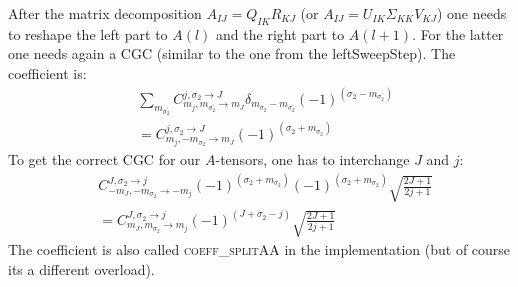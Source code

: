\documentclass[a4paper,10pt,parskip=full]{scrartcl}
\begin{document}
After the matrix decomposition $A_{IJ}=Q_{IK}R_{KJ}$ (or
$A_{IJ}=U_{IK}\Sigma_{KK}V_{KJ}$) one needs to reshape the left part
to $A(l)$ and the right part to $A(l+1)$. For the latter one needs
again a CGC (similar to the one from the leftSweepStep). The
coefficient is:
\begin{equation}
  \begin{split}
    &\sum_{m_{\sigma_2^\prime}}C^{j,\sigma_2\rightarrow
      J}_{m_j,m_{\sigma_2^\prime}\rightarrow
      m_{J}}\delta_{m_{\sigma_2}-m_{\sigma_2^\prime}}(-1)^{(\sigma_2-m_{\sigma_2^\prime})}\\
    &=C^{j,\sigma_2\rightarrow
      J}_{m_j,-m_{\sigma_2}\rightarrow
      m_{J}}(-1)^{(\sigma_2+m_{\sigma_2})}
  \end{split}
\end{equation}
To get the correct CGC for our $A$-tensors, one has to interchange $J$
and $j$:
\begin{equation}
  \begin{split}
    &C^{J,\sigma_2\rightarrow
      j}_{-m_J,-m_{\sigma_2}\rightarrow
      -m_{j}}(-1)^{(\sigma_2+m_{\sigma_2})}(-1)^{(\sigma_2+m_{\sigma_2})}\sqrt{\frac{2J+1}{2j+1}}\\
    &=C^{J,\sigma_2\rightarrow
      j}_{m_J,m_{\sigma_2}\rightarrow
      m_{j}}(-1)^{(J+\sigma_2-j)}\sqrt{\frac{2J+1}{2j+1}}
  \end{split}
\end{equation}
The coefficient is also called \textsc{coeff\_splitAA} in the
implementation (but of course its a different overload).
\end{document}
